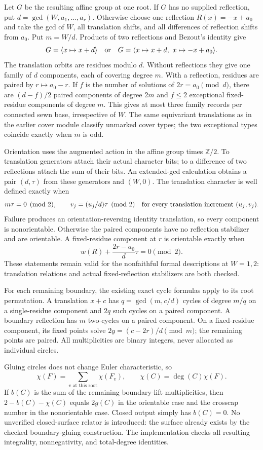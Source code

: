 Let $G$ be the resulting affine group at one root.  If $G$ has no supplied
reflection, put $d=\gcd(W,a_1,\ldots,a_r)$.  Otherwise choose one reflection
$R(x)=-x+a_0$ and take the gcd of $W$, all translation shifts, and all
differences of reflection shifts from $a_0$.  Put $m=W/d$.  Products of
two reflections and Bezout's identity give
\[
 G=\langle x\mapsto x+d\rangle
 \quad\hbox{or}\quad
 G=\langle x\mapsto x+d,\ x\mapsto-x+a_0\rangle.
\]
The translation orbits are residues modulo $d$.  Without reflections they
give one family of $d$ components, each of covering degree $m$.  With a
reflection, residues are paired by $r\mapsto a_0-r$.  If $f$ is the number
of solutions of $2r=a_0\pmod d$, there are $(d-f)/2$ paired components
of degree $2m$ and $f\le2$ exceptional fixed-residue components of degree
$m$.  This gives at most three family records per connected sewn base,
irrespective of $W$.  The same equivariant translations as in the earlier
cover module classify unmarked cover types; the two exceptional types
coincide exactly when $m$ is odd.

Orientation uses the augmented action in the affine group times
$\mathbb Z/2$.  To translation generators attach their actual character
bits; to a difference of two reflections attach the sum of their bits.
An extended-gcd calculation obtains a pair $(d,\tau)$ from these generators
and $(W,0)$.  The translation character is well defined exactly when
\[
 m\tau=0\pmod2,
 \qquad v_j=(u_j/d)\tau\pmod2
 \quad\hbox{for every translation increment }(u_j,v_j).
\]
Failure produces an orientation-reversing identity translation, so every
component is nonorientable.  Otherwise the paired components have no
reflection stabilizer and are orientable.  A fixed-residue component at
$r$ is orientable exactly when
\[
 w(R)+\frac{2r-a_0}{d}\tau=0\pmod2.
\]
These statements remain valid for the nonfaithful formal descriptions at
$W=1,2$: translation relations and actual fixed-reflection stabilizers are
both checked.

For each remaining boundary, the existing exact cycle formulas apply to
its root permutation.  A translation $x+c$ has
$q=\gcd(m,c/d)$ cycles of degree $m/q$ on a single-residue component and
$2q$ such cycles on a paired component.  A boundary reflection has $m$
two-cycles on a paired component.  On a fixed-residue component, its fixed
points solve $2y=(c-2r)/d\pmod m$; the remaining points are paired.
All multiplicities are binary integers, never allocated as individual circles.

Gluing circles does not change Euler characteristic, so
\[
 \chi(F)=\sum_{v\text{ at this root}}\chi(F_v),\qquad
 \chi(C)=\deg(C)\chi(F).
\]
If $b(C)$ is the sum of the remaining boundary-lift multiplicities, then
$2-b(C)-\chi(C)$ equals $2g(C)$ in the orientable case and the crosscap
number in the nonorientable case.  Closed output simply has $b(C)=0$.
No unverified closed-surface relator is introduced: the surface already
exists by the checked boundary-gluing construction.  The implementation
checks all resulting integrality, nonnegativity, and total-degree identities.

